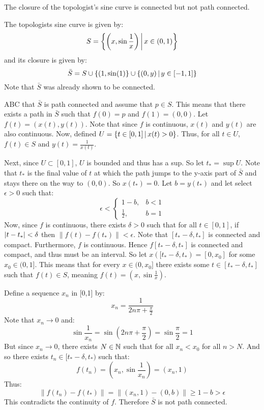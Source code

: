 \documentclass[letterpaper,12pt,fleqn]{article}
\newcommand{\norm}[1]{\left\lVert{#1}\right\rVert}
\newcommand{\e}{\epsilon}
\renewcommand{\d}{\delta}
\begin{document}
\begin{example}[Exercise 8.37]
  The closure of the topologist's sine curve is connected but not path connected.

  The topologists sine curve is given by:
  \[S=\left\{{\left(x,\sin\frac{1}{x}\right)}\,\middle|\,{x\in(0,1)}\right\}\]
  and its closure is given by:
  \[\bar{S}=S\cup\{(1,\sin(1)\}\cup\left\{{(0,y)}\,\middle|\,{y\in[-1,1]}\right\}\]
  Note that \(\bar{S}\) was already shown to be connected.

  ABC that \(\bar{S}\) is path connected and assume that \(p\in S\).  This means that there exists a path in
  \(\bar{S}\) such that \(f(0)=p\) and \(f(1)=(0,0)\).  Let \(f(t)=(x(t),y(t))\).  Note that since \(f\) is
  continuous, \(x(t)\) and \(y(t)\) are also continuous.  Now, defined \(U=\left\{{t\in[0,1]}\,\middle|\,{x(t)>0}\right\}\).  Thus,
  for all \(t\in U\), \(f(t)\in S\) and \(y(t)=\frac{1}{x(t)}\).

  Next, since \(U\subset[0,1]\), \(U\) is bounded and thus has a sup.  So let \(t_*=\sup U\).  Note that \(t_*\)
  is the final value of \(t\) at which the path jumps to the y-axis part of \(\bar{S}\) and stays there on the
  way to \((0,0)\).  So \(x(t_*)=0\).  Let \(b=y(t_*)\) and let select \(\e>0\) such that:
  \[\e<\begin{cases}
  1-b, & b<1 \\
  \frac{1}{2}, & b=1
  \end{cases}\]
  Now, since \(f\) is continuous, there exists \(\d>0\) such that for all \(t\in[0,1]\), if \(\abs{t-t_*}<\d\)
  then \(\norm{f(t)-f(t_*)}<\e\).  Note that \([t_*-\d,t_*]\) is connected and compact.  Furthermore, \(f\) is
  continuous.  Hence \(f[t_*-\d,t_*]\) is connected and compact, and thus must be an interval.  So let
  \(x([t_*-\d,t_*)=[0,x_0]\) for some \(x_0\in(0,1]\).  This means that for every \(x\in(0,x_0]\) there exists
  some \(t\in[t_*-\d,t_*]\) such that \(f(t)\in S\), meaning \(f(t)=(x,\sin\frac{1}{x})\).

  Define a sequence \(x_n\) in [0,1] by:
  \[x_n=\frac{1}{2n\pi+\frac{\pi}{2}}\]
  Note that \(x_n\to0\) and:
  \[\sin\frac{1}{x_n}=\sin\left(2n\pi+\frac{\pi}{2}\right)=\sin\frac{\pi}{2}=1\]
  But since \(x_n\to 0\), there exists \(N\in\mathbb{N}\) such that for all \(x_n<x_0\) for all \(n>N\).  And so there
  exists \(t_n\in[t_*-\d,t_*)\) such that:
  \[f(t_n)=\left(x_n,\sin\frac{1}{x_n}\right)=(x_n,1)\]
  Thus:
  \[\norm{f(t_n)-f(t_*)}=\norm{(x_n,1)-(0,b)}\ge1-b>\e\]
  This contradicts the continuity of \(f\).  Therefore \(\bar{S}\) is not path connected.
\end{example}
\end{document}
